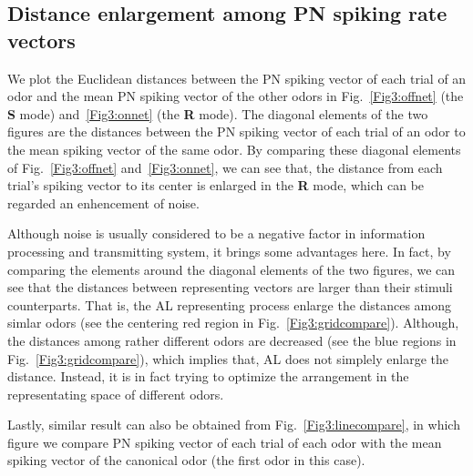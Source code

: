 \documentclass[12pt, a4paper]{article}
\begin{document}
\subsection{Distance enlargement among PN spiking rate vectors} \label{Sect:distance}
We plot the Euclidean distances between the PN spiking vector of each trial of an odor and the mean PN spiking vector of the other odors in Fig.~\ref{Fig3:offnet} (the {\bf S} mode) and~\ref{Fig3:onnet} (the {\bf R} mode). The diagonal elements of the two figures are the distances between the PN spiking vector of each trial of an odor to the mean spiking vector of the same odor. By comparing these diagonal elements of Fig.~\ref{Fig3:offnet} and~\ref{Fig3:onnet}, we can see that, the distance from each trial's spiking vector to its center is enlarged in the {\bf R} mode, which can be regarded an enhencement of noise.

Although noise is usually considered to be a negative factor in information processing and transmitting system, it brings some advantages here. In fact, by comparing the elements around the diagonal elements of the two figures, we can see that the distances between representing vectors are larger than their stimuli counterparts. That is, the AL representing process enlarge the distances among simlar odors (see the centering red region in Fig.~\ref{Fig3:gridcompare}). Although, the distances among rather different odors are decreased (see the blue regions in Fig.~\ref{Fig3:gridcompare}), which implies that, AL does not simplely enlarge the distance. Instead, it is in fact trying to optimize the arrangement in the representating space of different odors.

Lastly, similar result can also be obtained from Fig.~\ref{Fig3:linecompare}, in which figure we compare PN spiking vector of each trial of each odor with the mean spiking vector of the canonical odor (the first odor in this case).
\end{document}
